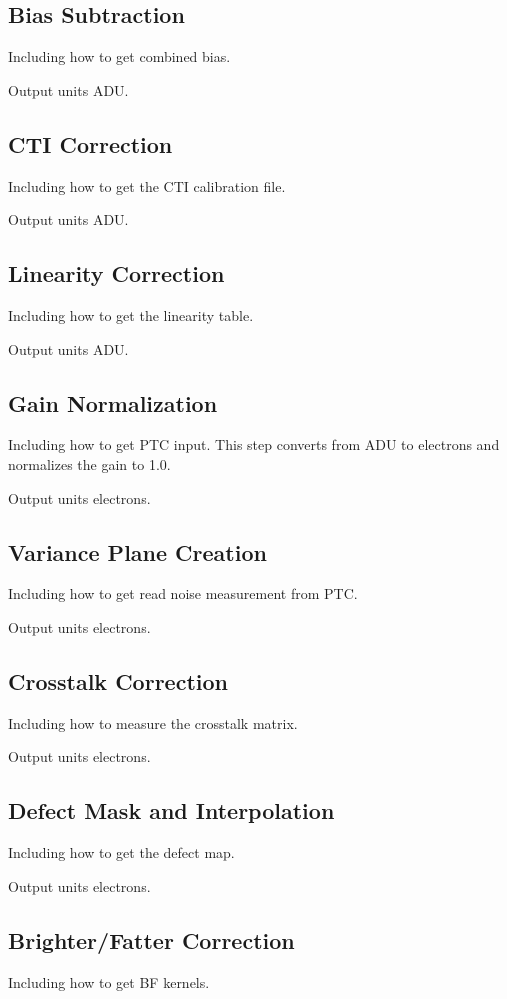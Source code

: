 \subsection{Bias Subtraction}
Including how to get combined bias.

Output units ADU.

\subsection{CTI Correction}
Including how to get the CTI calibration file.

Output units ADU.

\subsection{Linearity Correction}
Including how to get the linearity table.

Output units ADU.

\subsection{Gain Normalization}
Including how to get PTC input.
This step converts from ADU to electrons and normalizes the gain to 1.0.

Output units electrons.

\subsection{Variance Plane Creation}
Including how to get read noise measurement from PTC.

Output units electrons.

\subsection{Crosstalk Correction}
Including how to measure the crosstalk matrix.

Output units electrons.

\subsection{Defect Mask and Interpolation}
Including how to get the defect map.

Output units electrons.

\subsection{Brighter/Fatter Correction}
Including how to get BF kernels.

